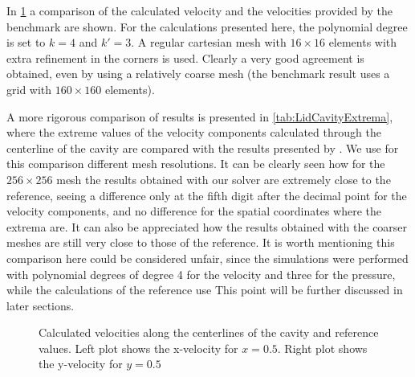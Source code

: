 In \cref{fig:LidVelocities} a comparison of the calculated velocity and the velocities provided by the benchmark are shown. For the calculations presented here, the polynomial degree is set to $k = 4$ and $k' = 3$. A regular cartesian mesh with $16\times16$ elements with extra refinement in the corners is used. Clearly a very good agreement is obtained, even by using a relatively coarse mesh (the benchmark result uses a grid with $160\times160$ elements). 

A more rigorous comparison of results is presented in \cref{tab:LidCavityExtrema}, where the extreme values of the velocity components calculated through the centerline of the cavity are compared with the results presented by \cite{botellaBenchmarkSpectralResults1998}. We use for this comparison different mesh resolutions. It can be clearly seen how for the $256\times 256$ mesh the results obtained with our solver are extremely close to the reference, seeing a difference only at the fifth digit after the decimal point for the velocity components, and no difference for the spatial coordinates where the extrema are. It can also be appreciated how the results obtained with the coarser meshes are still very close to those of the reference. It is worth mentioning this comparison here could be considered unfair, since the simulations were performed with polynomial degrees of degree 4 for the velocity and three for the pressure, while the calculations of the reference use %
 This point will be further discussed in later sections. 

\newpage
	\begin{figure}[tb]
		\caption{Calculated velocities along the centerlines of the cavity and reference values. Left plot shows the x-velocity for $x = 0.5$. Right plot shows the y-velocity for $y = 0.5$  }
		\label{fig:LidVelocities}
	\end{figure}

